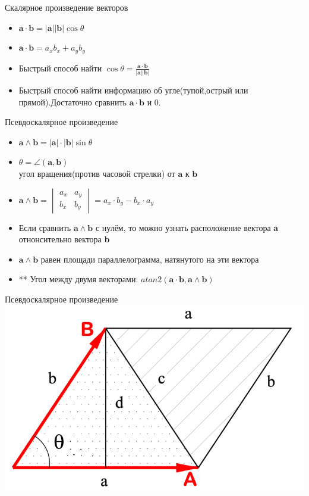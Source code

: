 \documentclass{beamer}
\begin{document}
\begin{frame}{Скалярное произведение векторов}
    \begin{itemize}
        \item $\mathbf{a}\cdot\mathbf{b}
        =\left|\mathbf{a}\right|\left|\mathbf{b}\right|\cos\theta$
        \item $\mathbf{a}\cdot\mathbf{b}=a_x b_x + a_y b_y$
        \item Быстрый способ найти $\cos\theta = \frac{\mathbf{a}\cdot\mathbf{b}}{\left|\mathbf{a}\right|\left|\mathbf{b}\right|}$
        \item Быстрый способ найти информацию об угле(тупой,острый или прямой).Достаточно сравнить $\mathbf{a}\cdot\mathbf{b}$ и $0$.
    \end{itemize}
\end{frame}

\begin{frame}{Псевдоскалярное произведение}
    
    \begin{itemize}
        \item $\mathbf a \wedge \mathbf b=|\mathbf a|\cdot|\mathbf b|\sin\theta$
        \item $\theta = \angle(\mathbf{a}, \mathbf{b})$\\ угол вращения(против часовой стрелки) от $\mathbf a$ к
        $\mathbf b$
        \item $\mathbf{a} \wedge \mathbf{b} = \begin{vmatrix} a_x & a_y \\ b_x & b_y \end{vmatrix} = a_x \cdot b_y - b_x \cdot a_y$
        \pause
        \item Если сравнить $\mathbf{a} \wedge \mathbf{b}$ с нулём, то можно узнать расположение вектора \textbf{a} отнонсительно вектора \textbf{b}
        \item $\mathbf{a} \wedge \mathbf{b}$ равен площади параллелограмма, натянутого на эти вектора
        \item ** Угол между двумя векторами: $atan2(\mathbf{a}\cdot\mathbf{b}, \mathbf{a} \wedge \mathbf{b})$
    \end{itemize}
\end{frame}
\begin{frame}{Псевдоскалярное произведение}
    \includegraphics[scale = 0.35]{Magnitude_cross_product.png}
\end{frame}
\end{document}
